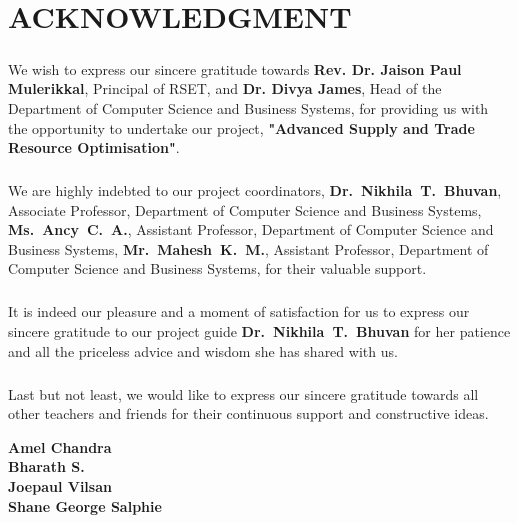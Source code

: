 \chapter*{ACKNOWLEDGMENT}
\setcounter{page}{1}
\vspace{1.5cm}


\paragraph{} We wish to express our sincere gratitude towards \textbf{Rev. Dr. Jaison Paul Mulerikkal}, Principal of RSET, and \textbf{Dr. Divya James}, Head of the Department of Computer Science and Business Systems, for providing us with the opportunity to undertake our project, \textbf{"Advanced Supply and Trade Resource Optimisation"}.

\paragraph{} We are highly indebted to our project coordinators, \textbf{\mbox{Dr. Nikhila T. Bhuvan}}, \mbox{Associate} Professor, Department of Computer Science and Business Systems, \textbf{\mbox{Ms. Ancy C. A.}}, Assistant Professor, Department of Computer Science and Business Systems, \textbf{\mbox{Mr. Mahesh K. M.}}, Assistant Professor, Department of Computer Science and Business Systems, for their valuable support.

\paragraph{} It is indeed our pleasure and a moment of satisfaction for us to express our sincere gratitude to our project guide \textbf{\mbox{Dr. Nikhila T. Bhuvan}} for her patience and all the priceless advice and wisdom she has shared with us.

\paragraph{} Last but not least, we would like to express our sincere gratitude towards all other teachers and friends for their continuous support and constructive ideas.

\begin{flushright}
	\textbf{Amel Chandra}\\
	\textbf{Bharath S.}\\
	\textbf{Joepaul Vilsan}\\
	\textbf{Shane George Salphie}
\end{flushright}
